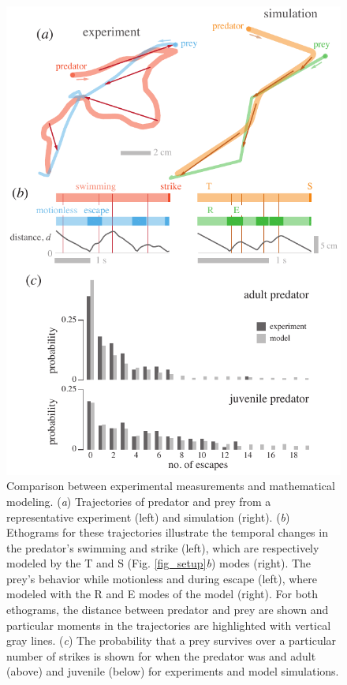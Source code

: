 \documentclass[]{rsos}%
\begin{document}
\begin{figure}[!h]
\centering
	\includegraphics[width=4.5in]{fig_trajectories}
\caption{Comparison between experimental measurements and mathematical modeling. 
(\textit{a}) Trajectories of predator and prey from a representative experiment (left) and simulation (right).
(\textit{b}) Ethograms for these trajectories illustrate the temporal changes in the predator's swimming and strike (left), which are respectively modeled by the T and S (Fig. \ref{fig_setup}\textit{b}) modes (right). 
The prey's behavior while motionless and during escape (left), where modeled with the R and E modes of the model (right).
For both ethograms, the distance between predator and prey are shown and particular moments in the trajectories are highlighted with vertical gray lines.
(\textit{c}) The probability that a prey survives over a particular number of strikes is shown for when the predator was and adult (above) and juvenile (below) for experiments and model simulations.   
}
\label{fig_traj}
\end{figure}
\end{document}
